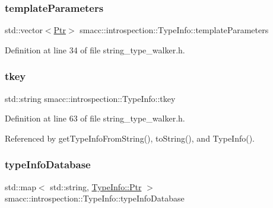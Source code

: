 \subsubsection{\texorpdfstring{template\+Parameters}{templateParameters}}
{\footnotesize\ttfamily std\+::vector$<$\hyperlink{classsmacc_1_1introspection_1_1TypeInfo_aa6ffd9c39811d59f7c771941b7fad860}{Ptr}$>$ smacc\+::introspection\+::\+Type\+Info\+::template\+Parameters}



Definition at line 34 of file string\+\_\+type\+\_\+walker.\+h.

\mbox{\label{classsmacc_1_1introspection_1_1TypeInfo_a697dd505119258dba1224d10eea5b2bd}} 
\subsubsection{\texorpdfstring{tkey}{tkey}}
{\footnotesize\ttfamily std\+::string smacc\+::introspection\+::\+Type\+Info\+::tkey\hspace{0.3cm}{\ttfamily [private]}}



Definition at line 63 of file string\+\_\+type\+\_\+walker.\+h.



Referenced by get\+Type\+Info\+From\+String(), to\+String(), and Type\+Info().

\mbox{\label{classsmacc_1_1introspection_1_1TypeInfo_ab780c03206b824aaf338135d16b0eff4}} 
\subsubsection{\texorpdfstring{type\+Info\+Database}{typeInfoDatabase}}
{\footnotesize\ttfamily std\+::map$<$ std\+::string, \hyperlink{classsmacc_1_1introspection_1_1TypeInfo_aa6ffd9c39811d59f7c771941b7fad860}{Type\+Info\+::\+Ptr} $>$ smacc\+::introspection\+::\+Type\+Info\+::type\+Info\+Database\hspace{0.3cm}{\ttfamily [static]}}



